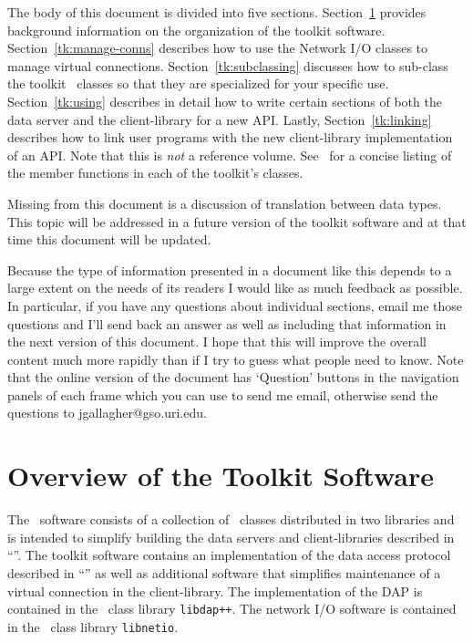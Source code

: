 The body of this document is divided into five
sections. Section~\ref{tk:overview} provides background information on the
organization of the toolkit software. Section~\ref{tk:manage-conns} describes
how to use the Network I/O classes to manage virtual
connections. Section~\ref{tk:subclassing} discusses how to sub-class the
toolkit \Cpp\ classes so that they are specialized for your specific
use. Section~\ref{tk:using} describes in detail how to write certain sections
of both the data server and the client-library for a new API. Lastly,
Section~\ref{tk:linking} describes how to link user programs with the new
client-library implementation of an API. Note that this is {\em not\/} a
reference volume. See \TKR\ for a concise listing of the member functions in
each of the toolkit's classes.

Missing from this document is a discussion of translation between data
types. This  topic will be addressed in a future version of the toolkit
software and at that time this document will be updated.

Because the type of information presented in a document like this depends
to a large extent on the needs of its readers I would like as much feedback
as possible. In particular, if you have any questions about individual
sections, email me those questions and I'll send back an answer as well as
including that information in the next version of this document. I hope that
this will improve the overall content much more rapidly than if I try to
guess what people need to know. Note that the online version of the document
has `Question' buttons in the navigation panels of each frame which you can
use to send me email, otherwise send the questions to
jgallagher@gso.uri.edu. 

\section{Overview of the Toolkit Software} 
\label{tk:overview}

The \TOOLKIT\ software consists of a collection of \Cpp\ classes distributed
in two libraries and is intended to simplify building the data servers and
client-libraries described in ``\DDD''. The toolkit software contains an
implementation of the data access protocol described in ``\DAP'' as well as
additional software that simplifies maintenance of a virtual connection in
the client-library. The implementation of the DAP is contained in the 
\Cpp\ class library {\tt libdap++}. The network I/O software is contained in
the \Cpp\ class library {\tt libnetio}.

